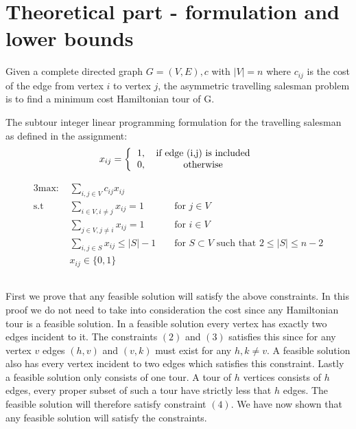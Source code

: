 \section{Theoretical part - formulation and lower bounds}
Given a complete directed graph $G = (V,E),c$ with $|V| = n$ where $c_{ij}$ is the cost of the edge from vertex $i$ to vertex $j$, the asymmetric travelling salesman problem is to find a minimum cost Hamiltonian tour of G.

The subtour integer linear programming formulation for the travelling salesman as defined in the assignment:
\[ 
x_{ij} =
\left \{
  \begin{tabular}{cc}
  1, & if edge (i,j) is included\\
  0, & otherwise 
  \end{tabular}
\right .
\]

\begin{alignat}{3}
\text{max: }    &\sum_{i,j \in V} c_{ij} x_{ij}\\
\text{s.t }     & \sum_{i \in V, i \neq j} x_{ij} = 1  && \text{ for } j \in V\\
                & \sum_{j \in V, j \neq i} x_{ij} = 1  && \text{ for } i \in V\\
                & \sum_{i,j \in S} x_{ij} \leq |S| - 1 && \text{ for } S \subset V \text{ such that } 2 \leq |S| \leq n - 2 \\
                & x_{ij} \in \{0,1\}
\end{alignat}

\subsection{}
First we prove that any feasible solution will satisfy the above constraints. In this proof we do not need to take into consideration the cost since any Hamiltonian tour is a feasible solution. In a feasible solution every vertex has exactly two edges incident to it. The constraints $(2)$ and $(3)$ satisfies this since for any vertex $v$ edges $(h,v)$ and $(v,k)$ must exist for any $h,k \neq v$. A feasible solution also has every vertex incident to two edges which satisfies this constraint. Lastly a feasible solution only consists of one tour. A tour of $h$ vertices consists of $h$ edges, every proper subset of such a tour have strictly less that $h$ edges. The feasible solution will therefore satisfy constraint $(4)$.  We have now shown that any feasible solution will satisfy the constraints. 

